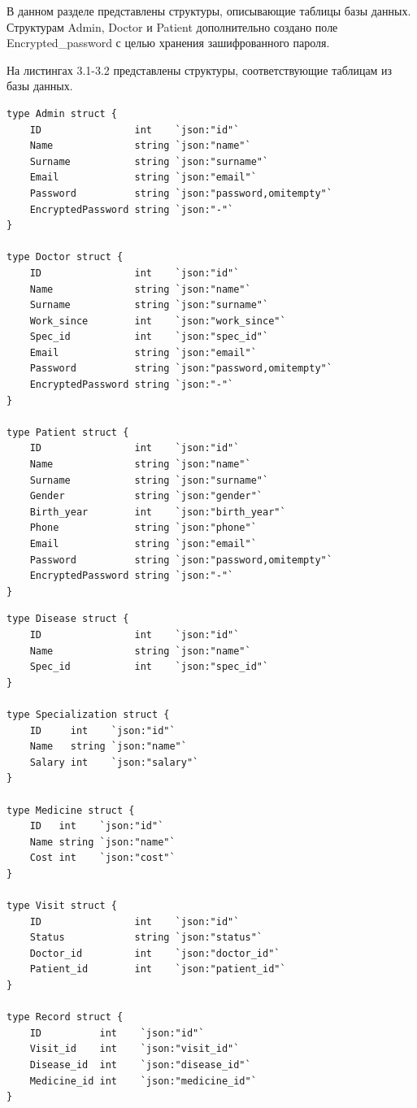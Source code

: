 В данном разделе представлены структуры, описывающие таблицы базы данных. Структурам Admin, Doctor и Patient дополнительно создано поле Encrypted\_password с целью хранения зашифрованного пароля.

На листингах 3.1-3.2 представлены структуры, соответствующие таблицам из базы данных.

\begin{lstlisting}[caption={Структуры, описывающие таблицы из базы данных}]
type Admin struct {
	ID                int    `json:"id"`
	Name		      string `json:"name"`
	Surname           string `json:"surname"`
	Email             string `json:"email"`
	Password          string `json:"password,omitempty"`
	EncryptedPassword string `json:"-"`
}

type Doctor struct {
	ID                int    `json:"id"`
	Name		      string `json:"name"`
	Surname           string `json:"surname"`
	Work_since        int    `json:"work_since"`
	Spec_id           int    `json:"spec_id"` 
	Email             string `json:"email"`
	Password          string `json:"password,omitempty"`
	EncryptedPassword string `json:"-"`
}

type Patient struct {
	ID                int    `json:"id"`
	Name		      string `json:"name"`
	Surname           string `json:"surname"`
	Gender            string `json:"gender"`
	Birth_year        int    `json:"birth_year"`
	Phone             string `json:"phone"`
	Email             string `json:"email"`
	Password          string `json:"password,omitempty"`
	EncryptedPassword string `json:"-"`
}
\end{lstlisting}
\clearpage
\begin{lstlisting}[caption={Структуры, описывающие таблицы из базы данных (продолжение)}]
type Disease struct {
	ID                int    `json:"id"`
	Name		      string `json:"name"`
	Spec_id           int    `json:"spec_id"`
}

type Specialization struct {
	ID     int    `json:"id"`
	Name   string `json:"name"`
	Salary int    `json:"salary"`
}

type Medicine struct {
	ID   int    `json:"id"`
	Name string `json:"name"`
	Cost int    `json:"cost"`
}

type Visit struct {
	ID                int    `json:"id"`
	Status            string `json:"status"`
	Doctor_id         int    `json:"doctor_id"`
	Patient_id        int    `json:"patient_id"`
}

type Record struct {
	ID          int    `json:"id"`
	Visit_id    int    `json:"visit_id"`
	Disease_id  int    `json:"disease_id"`
	Medicine_id int    `json:"medicine_id"`
}
\end{lstlisting}

